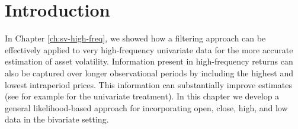 \label{ch:galerkin}

\section{Introduction}

In Chapter \ref{ch:sv-high-freq}, we showed how a filtering approach
can be effectively applied to very high-frequency univariate data for
the more accurate estimation of asset volatility. Information present
in high-frequency returns can also be captured over longer
observational periods by including the highest and lowest intraperiod
prices. This information can substantially improve estimates (see for
example \cite{rodriguez2012} for the univariate treatment). In this
chapter we develop a general likelihood-based approach for
incorporating open, close, high, and low data in the bivariate
setting.

